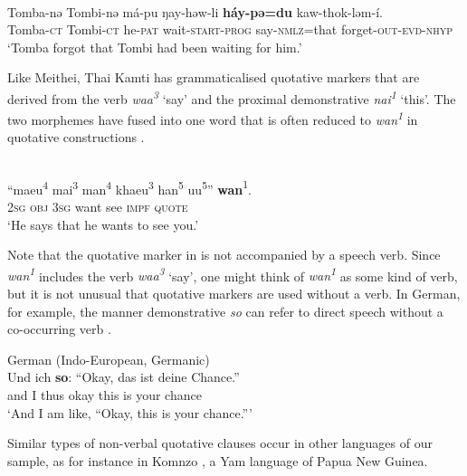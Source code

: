 \documentclass[output=paper,colorlinks,citecolor=brown]{langscibook}
\begin{document}
\ea\label{ex:diessel:15}
\\
\gll Tomba-nə Tombi-nə má-pu ŋay-həw-li \textbf{háy-pə=du} kaw-thok-ləm-í.\\
     Tomba-\textsc{ct} Tombi-\textsc{ct} he-\textsc{pat} wait-\textsc{start-prog} say-\textsc{nmlz}=that forget-\textsc{out-evd-nhyp}\\
\glt ‘Tomba forgot that Tombi had been waiting for him.’
\z

Like Meithei, Thai Kamti has grammaticalised quotative markers that are derived from the verb \textit{waa\textsuperscript{3}} ‘say’ and the proximal demonstrative \textit{nai\textsuperscript{1}} ‘this’. The two morphemes have fused into one word that is often reduced to \textit{wan\textsuperscript{1} }in quotative constructions .

\ea\label{ex:diessel:16}
\\
\gll “maeu\textsuperscript{4} mai\textsuperscript{3} man\textsuperscript{4}   khaeu\textsuperscript{3} han\textsuperscript{5} uu\textsuperscript{5}”   \textbf{wan}{\textsuperscript{1}}.\\
     {\db}\textsc{2sg}   \textsc{obj}  \textsc{3sg}   want  see  \textsc{impf}  \textsc{quote}\\
\glt ‘He says that he wants to see you.’
\z

Note that the quotative marker in  is not accompanied by a speech verb. Since \textit{wan\textsuperscript{1}} includes the verb \textit{waa\textsuperscript{3}} ‘say’, one might think of \textit{wan\textsuperscript{1}} as some kind of verb, but it is not unusual that quotative markers are used without a verb. In German, for example, the manner demonstrative \textit{so} can refer to direct speech without a co-occurring verb  \citep{Golato2000}.

\ea\label{ex:diessel:17}
{German (Indo-European, Germanic)}\\
\gll Und ich  \textbf{so}:  “Okay,  das   ist  deine  Chance.”\\
     and  I  thus   {\db}okay  this  is  your   chance\\
\glt ‘And I am like, “Okay, this is your chance.”’
\z

Similar types of non-verbal quotative clauses occur in other languages of our sample, as for instance in Komnzo , a Yam language of Papua New Guinea.
\end{document}

